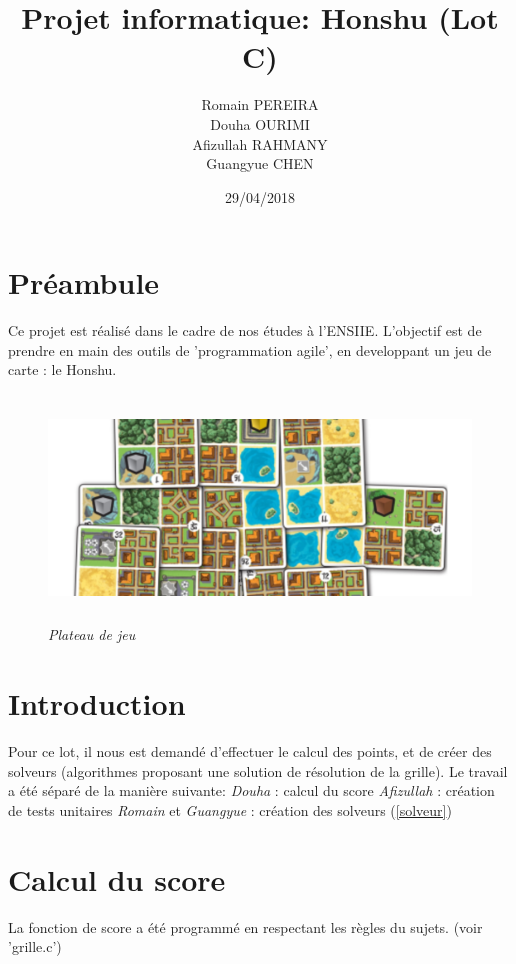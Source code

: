 \documentclass[10pt]{article}
\title{Projet informatique: Honshu (Lot C)}
\author{
  Romain PEREIRA\\
  Douha OURIMI\\
  Afizullah RAHMANY\\
  Guangyue CHEN
}
\date{29/04/2018}
\begin{document}
  \maketitle
  \tableofcontents
  
  \newpage
  \section*{Préambule}
  Ce projet est réalisé dans le cadre de nos études à l'ENSIIE.
  L'objectif est de prendre en main des outils de 'programmation agile',
  en developpant un jeu de carte : le Honshu.
  \newline
  \begin{figure}[H]
    \begin{center}
      \includegraphics[height=6cm,keepaspectratio]{../images/honshu.png}
    \end{center}
    \caption{\textit{Plateau de jeu}}
    \label{honshu_introduction}
  \end{figure}
  \newpage
  \section{Introduction}
    Pour ce lot, il nous est demandé d'effectuer le calcul des points, et de créer des solveurs (algorithmes proposant une solution de résolution de la grille).
    Le travail a été séparé de la manière suivante:
    \newline
    \newline
    \textit{Douha} : calcul du score
    \newline
    \newline
    \textit{Afizullah} : création de tests unitaires
    \newline
    \newline
    \textit{Romain} et \textit{Guangyue} : création des solveurs (\ref{solveur})
  \section{Calcul du score}
    La fonction de score a été programmé en respectant les règles du sujets.
    (voir 'grille.c')
\end{document}
